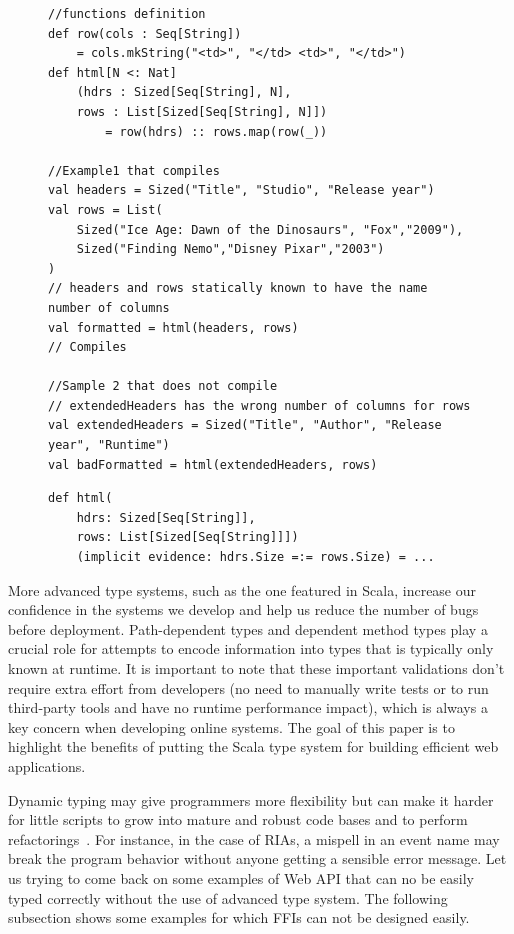 \documentclass[runningheads,a4paper]{llncs}
\begin{document}
\begin{figure}
\begin{lstlisting}[label=pathdependenttypeexample,caption=Path dependent type example]
//functions definition
def row(cols : Seq[String]) 
	= cols.mkString("<td>", "</td> <td>", "</td>")
def html[N <: Nat]
	(hdrs : Sized[Seq[String], N],
	rows : List[Sized[Seq[String], N]]) 
		= row(hdrs) :: rows.map(row(_))

//Example1 that compiles
val headers = Sized("Title", "Studio", "Release year")
val rows = List(  
	Sized("Ice Age: Dawn of the Dinosaurs", "Fox","2009"),
	Sized("Finding Nemo","Disney Pixar","2003")
)
// headers and rows statically known to have the name number of columns
val formatted = html(headers, rows)                        // Compiles

//Sample 2 that does not compile
// extendedHeaders has the wrong number of columns for rows
val extendedHeaders = Sized("Title", "Author", "Release year", "Runtime")
val badFormatted = html(extendedHeaders, rows)          
\end{lstlisting}
\end{figure}

\begin{figure}
\begin{lstlisting}[label=path-dependent-type-example-2,caption=Path-dependent type example]
def html(
    hdrs: Sized[Seq[String]],
    rows: List[Sized[Seq[String]]])
    (implicit evidence: hdrs.Size =:= rows.Size) = ...
\end{lstlisting}
\end{figure}


More advanced type systems, such as the one featured in Scala, increase our confidence in the
systems we develop and help us reduce the number of bugs before deployment. Path-dependent types and
dependent method types play a crucial role for attempts to encode information into types that is
typically only known at runtime. It is important to note that these important validations don't
require extra effort from developers (no need to manually write tests or to run third-party tools and have no runtime performance impact), which is always a key concern when developing online
systems. The goal of this paper is to highlight the benefits of putting the Scala type system for
building efficient web applications.


% 
Dynamic typing may give programmers more flexibility but can make it harder for little scripts to grow into mature
and robust code bases and to perform refactorings~\cite{Meijer04_StaticDynamic}. For instance, in the case of RIAs, a
mispell in an event name may break the program behavior without anyone getting a sensible error message. Let us trying to come back on some examples of Web API that can no be easily typed correctly without the use of advanced type system. The following subsection shows some examples for which FFIs can not be designed easily. 
\end{document}
